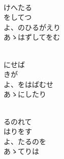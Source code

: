 \documentclass[10pt,b5j]{tarticle} %
\begin{document}
\vspace{1.5em} %
\newcommand{\linespace}{0.5em} %
\newcommand{\blocksize}{0.5\hsize} %
\newcommand{\itemmargin}{6em} %
\begin{enumerate} %
    \setlength{\itemindent}{\itemmargin} %
    \begin{minipage}[c]{\blocksize}
    
        \vspace{\linespace}
        \item~\\
        けへたる\\
        をしてつ\\
        よ、のひるがえり\\
        あゝはずしてをむ
        
        \vspace{\linespace}
        \item~\\
        にせば\\
        きが\\
        よ、をはばむせ\\
        あゝにしたり
        
        \vspace{\linespace}
        \item~\\
        るのれて\\
        はりをす\\
        よ、たるのを\\
        あゝてりは
    
    \end{minipage}
\end{enumerate} %
\end{document}
